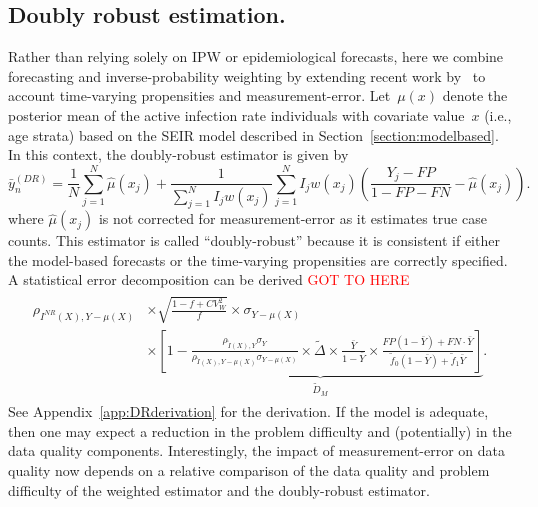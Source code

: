 \documentclass[11pt]{amsart}
\numberwithin{equation}{section}
\theoremstyle{plain}
\begin{document}
 \subsection{Doubly robust estimation.}
 Rather than relying solely on IPW or epidemiological forecasts, here we combine forecasting and inverse-probability weighting by extending recent work by~\cite{Chen2019} to account time-varying propensities and measurement-error.
 Let~$\mu(x)$ denote the posterior mean of the active infection rate individuals with covariate value~$x$ (i.e., age strata) based on the SEIR model described in Section~\ref{section:modelbased}. In this context, the doubly-robust estimator is given by
 $$
 \bar y_{n}^{(DR)} = \frac{1}{N} \sum_{j=1}^N \hat \mu (x_j) + \frac{1}{\sum_{j=1}^N I_j w (x_j)} \sum_{j=1}^N I_j w(x_j) \left( \frac{Y_j - FP}{1 - FP - FN} - \hat \mu(x_j) \right).
 $$
 where $\hat \mu(x_j)$ is not corrected for measurement-error as it estimates true case counts. This estimator is called ``doubly-robust'' because it is consistent if either the model-based forecasts or the time-varying propensities are correctly specified. A statistical error decomposition can be derived
 \textcolor{red}{GOT TO HERE}
 \begin{align}
 \label{eq:statdecomp3}
 \begin{split}
 \rho_{I^{NR} (X), Y-\mu(X)} &\times \sqrt{\frac{1-f+ CV^2_W}{f}} \times \sigma_{Y-\mu(X)}  \\
 &\times \underbrace{\left[ 1 - \frac{\rho_{\tilde I(X),Y} \sigma_{Y}}{\rho_{\tilde I(X),Y-\mu(X)} \sigma_{Y-\mu(X)}} \times \tilde \Delta \times \frac{\bar Y}{1-\bar Y} \times \frac{FP(1-\bar Y) + FN \cdot \bar Y}{\tilde f_0 (1-\bar Y) + \tilde f_1 \bar Y} \right]}_{\tilde D_M}.
 \end{split}
 \end{align}
 See Appendix~\ref{app:DRderivation} for the derivation.
 If the model is adequate, then one may expect a reduction in the problem difficulty and (potentially) in the data quality components.
 Interestingly, the impact of measurement-error on data quality now depends on a relative comparison of the data quality and problem difficulty of the weighted estimator and the doubly-robust estimator.
\end{document}
